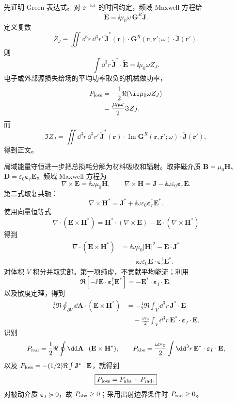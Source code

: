 \begin{derivation}[源损失中的吸收与辐射通道]
先证明 Green 表达式。对 $\ee^{-\ii\omega t}$ 的时间约定，频域 Maxwell 方程给
\[
\widetilde{\mathbf E}
=\ii\mu_0\omega\,\mathbf G^R\widetilde{\mathbf J}.
\]
定义复数
\[
Z_J
\equiv
\iint\dd^3r\,\dd^3r'\,
\widetilde{\mathbf J}^{*}(\mathbf r)\cdot
\mathbf G^R(\mathbf r,\mathbf r';\omega)
\cdot\widetilde{\mathbf J}(\mathbf r').
\]
则
\[
\int\dd^3r\,\widetilde{\mathbf J}^{*}\cdot\widetilde{\mathbf E}
=\ii\mu_0\omega Z_J.
\]
电子或外部源损失给场的平均功率取负的机械做功率，
\begin{align*}
P_{\rm loss}
&=-\frac12\Re(\ii\mu_0\omega Z_J)\\
&=\frac{\mu_0\omega}{2}\Im Z_J.
\end{align*}
而
\[
\Im Z_J
=\iint\dd^3r\,\dd^3r'\,
\widetilde{\mathbf J}^{*}(\mathbf r)\cdot
\operatorname{Im}\mathbf G^R(\mathbf r,\mathbf r';\omega)
\cdot\widetilde{\mathbf J}(\mathbf r'),
\]
得到正文。

局域能量守恒进一步把总损耗分解为材料吸收和辐射。取非磁介质
$\mathbf B=\mu_0\mathbf H$、
$\mathbf D=\varepsilon_0\boldsymbol\varepsilon_r\mathbf E$。频域 Maxwell 方程为
\[
\nabla\times\mathbf E=\ii\omega\mu_0\mathbf H,
\qquad
\nabla\times\mathbf H=\mathbf J-\ii\omega\varepsilon_0
\boldsymbol\varepsilon_r\mathbf E.
\]
第二式取复共轭：
\[
\nabla\times\mathbf H^*
=\mathbf J^*+\ii\omega\varepsilon_0
\boldsymbol\varepsilon_r^\dagger\mathbf E^*.
\]
使用向量恒等式
\[
\nabla\cdot(\mathbf E\times\mathbf H^*)
=\mathbf H^*\cdot(\nabla\times\mathbf E)
-\mathbf E\cdot(\nabla\times\mathbf H^*)
\]
得到
\begin{align*}
\nabla\cdot(\mathbf E\times\mathbf H^*)
&=\ii\omega\mu_0|\mathbf H|^2
-\mathbf E\cdot\mathbf J^*\\
&\quad
-\ii\omega\varepsilon_0
\mathbf E\cdot\boldsymbol\varepsilon_r^\dagger\mathbf E^*.
\end{align*}
对体积 $V$ 积分并取实部。第一项纯虚，不贡献平均能流；利用
\[
\Re\!\left[-\ii\,
\mathbf E\cdot\boldsymbol\varepsilon_r^\dagger\mathbf E^*\right]
=-\mathbf E^*\cdot\boldsymbol\varepsilon_I\cdot\mathbf E,
\]
以及散度定理，得到
\begin{align*}
\frac12\Re\oint_{\partial V}\dd\mathbf A\cdot
(\mathbf E\times\mathbf H^*)
&=-\frac12\Re\int_V\dd^3r\,\mathbf J^*\cdot\mathbf E\\
&\quad
-\frac{\omega\varepsilon_0}{2}
\int_V\dd^3r\,
\mathbf E^*\cdot\boldsymbol\varepsilon_I\cdot\mathbf E.
\end{align*}
识别
\[
P_{\rm rad}
=\frac12\Re\oint\dd\mathbf A\cdot(\mathbf E\times\mathbf H^*),
\qquad
P_{\rm abs}
=\frac{\omega\varepsilon_0}{2}\int\dd^3r\,
\mathbf E^*\cdot\boldsymbol\varepsilon_I\cdot\mathbf E,
\]
以及
$P_{\rm loss}=-(1/2)\Re\int\mathbf J^*\cdot\mathbf E$，就得到
\[
\boxed{P_{\rm loss}=P_{\rm abs}+P_{\rm rad}.}
\]
对被动介质 $\boldsymbol\varepsilon_I\succeq0$，故 $P_{\rm abs}\ge0$；采用出射边界条件时 $P_{\rm rad}\ge0$。
\end{derivation}

